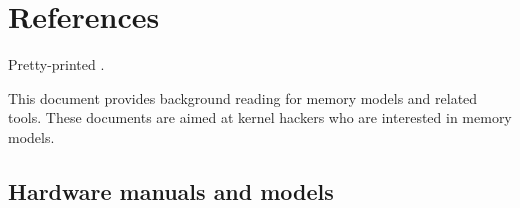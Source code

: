 \section{References}
\label{sec:docs:References}

\begin{Note}
  Pretty-printed .
\end{Note}

This document provides background reading for memory models and related
tools.
These documents are aimed at kernel hackers who are interested
in memory models.


\subsection{Hardware manuals and models}

